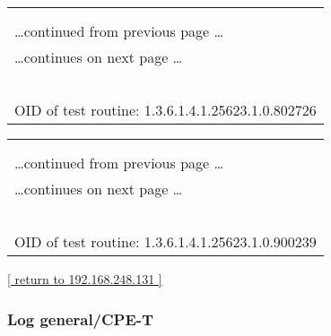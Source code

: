 \documentclass{article}
\begin{document}
\begin{longtable}{|p{}|}
\hline
\rowcolor{openvas_log}{\color{white}{Log (CVSS: 0.0) }}\\
\rowcolor{openvas_log}{\color{white}{NVT: Microsoft SMB Signing Disabled}}\\
\hline
\endfirsthead
\hfill\ldots continued from previous page \ldots \\
\hline
\endhead
\hline
\ldots continues on next page \ldots \\
\endfoot
\hline
\endlastfoot
\\
\rowcolor{white}{\verb=SMB signing is disabled on this host=}\\
\rowcolor{white}{\verb==}\\
\rowcolor{white}{\verb==}\\
\\
OID of test routine: 1.3.6.1.4.1.25623.1.0.802726\\
\end{longtable}

\begin{longtable}{|p{}|}
\hline
\rowcolor{openvas_log}{\color{white}{Log (CVSS: 0.0) }}\\
\rowcolor{openvas_log}{\color{white}{NVT: Checks for open tcp ports}}\\
\hline
\endfirsthead
\hfill\ldots continued from previous page \ldots \\
\hline
\endhead
\hline
\ldots continues on next page \ldots \\
\endfoot
\hline
\endlastfoot
\\
\rowcolor{white}{\verb=Open TCP ports: 445, 135, 139=}\\
\rowcolor{white}{\verb==}\\
\rowcolor{white}{\verb==}\\
\\
OID of test routine: 1.3.6.1.4.1.25623.1.0.900239\\
\end{longtable}

\begin{footnotesize}\hyperref[host:192.168.248.131]{[ return to 192.168.248.131 ]}\end{footnotesize}
\subsubsection{Log general/CPE-T}
\label{port:192.168.248.131 general/CPE-T Log}
\end{document}
